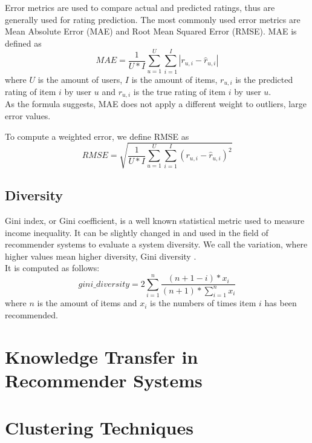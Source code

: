 Error metrics are used to compare actual and predicted ratings, thus are generally used for rating prediction. The most commonly used error metrics are Mean Absolute Error (MAE) and Root Mean Squared Error (RMSE).
MAE is defined as
\[ MAE = \frac{1}{U*I} \sum_{u=1}^{U} \sum_{i=1}^{I} |r_{u,i} - \hat{r}_{u,i}| \]
where $U$ is the amount of users, $I$ is the amount of items, $r_{u,i}$ is the predicted rating of item $i$ by user $u$ and $r_{u,i}$ is the true rating of item $i$ by user $u$.\\
As the formula suggests, MAE does not apply a different weight to outliers, large error values.\par
To compute a weighted error, we define RMSE as
\[ RMSE = \sqrt{\frac{1}{U*I} \sum_{u=1}^{U} \sum_{i=1}^{I} (r_{u,i} - \hat{r}_{u,i})^2} \]


\subsection{Diversity}

Gini index, or Gini coefficient, is a well known statistical metric used to measure income inequality. It can be slightly changed in and used in the field of recommender systems to evaluate a system diversity. We call the variation, where higher values mean higher diversity, Gini diversity \cite{Diversity}.\\
It is computed as follows:
\[ gini\_diversity = 2 \sum_{i=1}^{n} \frac{(n + 1 - i) * x_i}{(n + 1) * \sum_{i=1}^{n} x_i} \]
where $n$ is the amount of items and $x_i$ is the numbers of times item $i$ has been recommended.



\section{Knowledge Transfer in Recommender Systems}



\section{Clustering Techniques}
